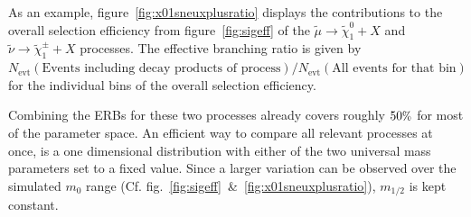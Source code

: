 \noindent As an example, figure~\ref{fig:x01sneuxplusratio} displays the contributions to the overall selection efficiency from figure~\ref{fig:sigeff} of the $\tilde{\mu} \rightarrow \tilde{\chi}^0_1 + X$ and $\tilde{\nu} \rightarrow \tilde{\chi}^\pm_1 + X$ processes. The effective branching ratio is given by $N_{\text{evt}}(\text{Events including decay products of process}) / N_{\text{evt}}(\text{All events for that bin})$ for the individual bins of the overall selection efficiency.

Combining the ERBs for these two processes already covers roughly $50\pct$ for most of the parameter space. An efficient way to compare all relevant processes at once, is a one dimensional distribution with either of the two universal mass parameters set to a fixed value. Since a larger variation can be observed over the simulated $m_0$ range (Cf. fig.~\ref{fig:sigeff}~\&~\ref{fig:x01sneuxplusratio}), $m_{1/2}$ is kept constant.

